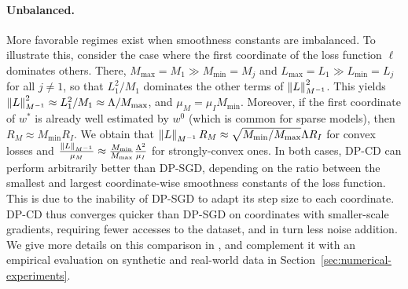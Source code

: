 \paragraph{Unbalanced.}
More favorable regimes exist when smoothness constants are imbalanced.
To illustrate this, consider the case where the first
coordinate of the loss function $\ell$ dominates others.
There, $M_{\max} \!=\! M_1 \!\gg\! M_{\min} \!=\! M_j$ and
$L_{\max} \!=\! L_1 \!\gg\! L_{\min}\!=\! L_j $ for all $j\neq 1$, so that
$L_1^2/M_1$ dominates the other terms of $\left \lVert L \right \rVert_{M^{-1}}^2$.  This
yields
$\left \lVert L \right \rVert_{M^{-1}}^2 \approx L_1^2 / M_1 \approx \Lambda / M_{\max}$,
and $\mu_M = \mu_I M_{\min}$.
Moreover, if the first coordinate of $w^*$ is already well estimated
by $w^0$ (which is common for sparse models), then
$R_M \approx M_{\min}
  R_I$. %
We obtain that
$\left \lVert L \right \rVert_{M^{-1}} R_M \approx \sqrt{{M_{\min}}/{M_{\max}}} \Lambda
  R_I$ for convex losses and
$\frac{\left \lVert L \right \rVert_{M^{-1}}}{\mu_M} \approx
  \frac{M_{\min}}{M_{\max}}\frac{\Lambda^2}{\mu_I}$ for strongly-convex
ones.
In both cases, DP-CD can perform arbitrarily better than DP-SGD,
depending on the ratio between the smallest and largest
coordinate-wise smoothness constants of the loss function.  This is
due to the inability of DP-SGD to adapt its step size to each coordinate.
DP-CD thus converges quicker than DP-SGD on coordinates with
smaller-scale gradients, requiring fewer accesses to the dataset, and
in turn less noise addition. We give more details on this comparison
in , and complement it with an empirical
evaluation on synthetic and real-world data in
Section~\ref{sec:numerical-experiments}.



















